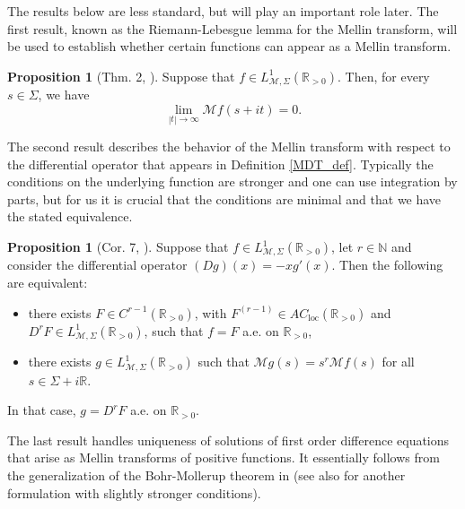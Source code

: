 \documentclass[a4paper,12pt,oneside]{article}
\theoremstyle{definition}
\newtheorem{prop}[defi]{Proposition}
\newcommand{\N}{\mathbb{N}}
\newcommand{\R}{\mathbb{R}}
\newcommand{\MT}[1]{\mathcal{M}#1}
\begin{document}
The results below are less standard, but will play an important role later. The first result, known as the Riemann-Lebesgue lemma for the Mellin transform, will be used to establish whether certain functions can appear as a Mellin transform.

\begin{prop}[Thm. 2, \cite{BJ:MT}] \label{MT_RL}
    Suppose that $f\in L_{\MT{},\Sigma}^{1}(\R_{>0})$. Then, for every $s\in\Sigma$, we have
        $$ \lim_{|t|\to\infty} \MT{f}(s+it) = 0. $$
\end{prop}

The second result describes the behavior of the Mellin transform with respect to the differential operator that appears in Definition \ref{MDT_def}. Typically the conditions on the underlying function are stronger and one can use integration by parts, but for us it is crucial that the conditions are minimal and that we have the stated equivalence.

\begin{prop}[Cor. 7, \cite{BJ:MT}] \label{MT_DIFF}
    Suppose that $f\in L_{\MT{},\Sigma}^{1}(\R_{>0})$, let $r\in\N$ and consider the differential operator $(Dg)(x)=-xg'(x)$. Then the following are equivalent:
    \begin{itemize}
        \item[i)] there exists $F\in C^{r-1}(\R_{>0})$, with $F^{(r-1)}\in AC_{\text{loc}}(\R_{>0})$ and $D^r F\in L_{\MT{},\Sigma}^{1}(\R_{>0})$, such that $f=F$ a.e. on $\R_{>0}$,
        \item[ii)] there exists $g\in L_{\MT{},\Sigma}^{1}(\R_{>0})$ such that $\MT{g}(s) = s^r \MT{f}(s)$ for all $s\in\Sigma+i\R$.
    \end{itemize}
    In that case, $g=D^r F$ a.e. on $\R_{>0}$.
\end{prop}

The last result handles uniqueness of solutions of first order difference equations that arise as Mellin transforms of positive functions. It essentially follows from the generalization of the Bohr-Mollerup theorem in \cite{MZ:B-M} (see also \cite[Thm. 3.1]{W:B-M} for another formulation with slightly stronger conditions).
\end{document}
